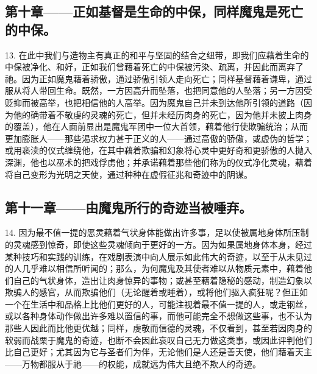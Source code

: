 
\subsection{第十章——正如基督是生命的中保，同样魔鬼是死亡的中保。}

13. 在此中我们与造物主有真正的和平与坚固的结合之纽带，即我们应藉着生命的中保被净化、和好，正如我们曾藉着死亡的中保被污染、疏离，并因此而离弃了祂。因为正如魔鬼藉着骄傲，通过骄傲引领人走向死亡；同样基督藉着谦卑，通过服从将人带回生命。既然，一方因高升而坠落，也把同意他的人坠落；另一方因受贬抑而被高举，也把相信他的人高举。因为魔鬼自己并未到达他所引领的道路（因为他的确带着不敬虔的灵魂的死亡，但并未经历肉身的死亡，因为他并未披上肉身的覆盖），他在人面前显出是魔鬼军团中一位大首领，藉着他行使欺骗统治；从而更加膨胀人——那些渴求权力甚于正义的人——通过高傲的骄傲，或虚伪的哲学；或用亵渎的仪式缠绕他，在其中藉着欺骗和幻象将心灵中更好奇和更骄傲的人抛入深渊，他也以巫术的把戏俘虏他；并承诺藉着那些他们称为的仪式净化灵魂，藉着将自己变形为光明之天使，通过种种在虚假征兆和奇迹中的阴谋。\par


\subsection{第十一章——由魔鬼所行的奇迹当被唾弃。}

14. 因为最不值一提的恶灵藉着气状身体能做出许多事，足以使被属地身体所压制的灵魂感到惊奇，即使这些灵魂倾向于更好的一方。因为如果属地身体本身，经过某种技巧和实践的训练，在戏剧表演中向人展示如此伟大的奇迹，以至于从未见过的人几乎难以相信所听闻的；那么，为何魔鬼及其使者难以从物质元素中，藉着他们自己的气状身体，造出让肉身惊异的事物；或甚至藉着隐秘的感动，制造幻象以欺骗人的感官，从而欺骗他们（无论醒着或睡着），或将他们驱入疯狂呢？但正如一个在生活中和品格上比他们更好的人，可能注视着最不值一提的人，或走钢丝，或以各种身体动作做出许多难以置信的事，而他可能完全不想做这些事，也不认为那些人因此而比他更优越；同样，虔敬而信德的灵魂，不仅看到，甚至若因肉身的软弱而战栗于魔鬼的奇迹，也断不会因此哀叹自己无力做这类事，或因此评判他们比自己更好；尤其因为它与圣者们为伴，无论他们是人还是善天使，他们藉着天主——万物都服从于祂——的权能，成就远为伟大且绝不欺人的奇迹。\par

